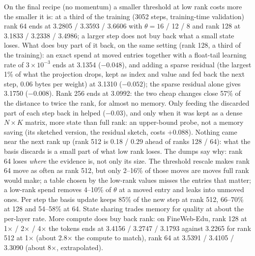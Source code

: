 \documentclass[10pt,twocolumn]{article}
\begin{document}
On the final recipe (no momentum) a smaller threshold at low rank costs more the smaller it is: at a third of the
training (3052 steps, training-time validation) rank 64 ends at 3.2805 / 3.3593 / 3.6606 with $\theta=16$ / 12 / 8 and
rank 128 at 3.1833 / 3.2338 / 3.4986; a larger step does not buy back what a small state loses. What does buy part of it back, on the
same setting (rank 128, a third of the training): an exact spend at moved entries together with a float-tail learning
rate of $3\times10^{-3}$ ends at 3.1354 ($-0.048$), and adding a sparse residual (the largest 1\% of what the projection
drops, kept as index and value and fed back the next step, 0.06 bytes per weight) at 3.1310 ($-0.052$); the sparse
residual alone gives 3.1750 ($-0.008$). Rank 256 ends at 3.0992: the two cheap changes close 57\% of the distance to
twice the rank, for almost no memory. Only feeding the discarded part of each step back in helped ($-0.03$), and only when it was kept as a dense $N\times K$
matrix, more state than full rank: an upper-bound probe, not a memory saving (its sketched version, the residual
sketch, costs $+0.088$). Nothing came near the next rank up (rank 512 is 0.18 / 0.29 ahead of ranks 128 / 64): what
the basis discards is a small part of what low rank loses. The dumps say why: rank 64 loses \emph{where} the evidence is, not only
its size. The threshold rescale makes rank 64 move as often as rank 512, but only 2--16\% of those moves are moves full
rank would make; a table chosen by the low-rank values misses the entries that matter; a low-rank spend removes 4--10\% of
$\theta$ at a moved entry and leaks into unmoved ones. Per step the basis update keeps 85\% of the new step at rank 512,
66--70\% at 128 and 54--58\% at 64. State sharing trades memory for quality at about the per-layer rate. More compute
does buy back rank: on FineWeb-Edu, rank 128 at 1$\times$ / 2$\times$ / 4$\times$ the tokens ends at 3.4156 / 3.2747 /
3.1793 against 3.2265 for rank 512 at 1$\times$ (about 2.8$\times$ the compute to match), rank 64 at 3.5391 / 3.4105 /
3.3090 (about 8$\times$, extrapolated).
\end{document}
